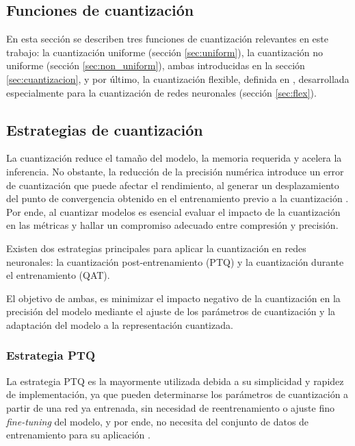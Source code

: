 \subsection{Funciones de cuantización}
\label{sec:funciones_de_cuantizacion}

En esta sección se describen tres funciones de cuantización relevantes en este trabajo: la cuantización uniforme (sección \ref{sec:uniform}), la cuantización no uniforme (sección \ref{sec:non_uniform}), ambas introducidas en la sección \ref{sec:cuantizacion}, y por último, la cuantización flexible, definida en \cite{electronics13101923}, desarrollada especialmente para la cuantización de redes neuronales (sección \ref{sec:flex}).



\subsection{Estrategias de cuantización}
\label{sec:estrategias_de_cuantizacion}
La cuantización reduce el tamaño del modelo, la memoria requerida y acelera la inferencia. No obstante, la reducción de la precisión numérica introduce un error de cuantización que puede afectar el rendimiento, al generar un desplazamiento del punto de convergencia obtenido en el entrenamiento previo a la cuantización \cite{gholami2021surveyquantizationmethodsefficient}. Por ende, al cuantizar modelos es esencial evaluar el impacto de la cuantización en las métricas y hallar un compromiso adecuado entre compresión y precisión.

Existen dos estrategias principales para aplicar la cuantización en redes neuronales: la cuantización post-entrenamiento (PTQ) y la cuantización durante el entrenamiento (QAT).

El objetivo de ambas, es minimizar el impacto negativo de la cuantización en la precisión del modelo mediante el ajuste de los parámetros de cuantización y la adaptación del modelo a la representación cuantizada.

\subsubsection{Estrategia PTQ}
La estrategia PTQ es la mayormente utilizada debida a su simplicidad y rapidez de implementación, ya que pueden determinarse los parámetros de cuantización a partir de una red ya entrenada, sin necesidad de reentrenamiento o ajuste fino \textit{fine-tuning} del modelo, y por ende, no necesita del conjunto de datos de entrenamiento para su aplicación \cite{gholami2021surveyquantizationmethodsefficient}.

